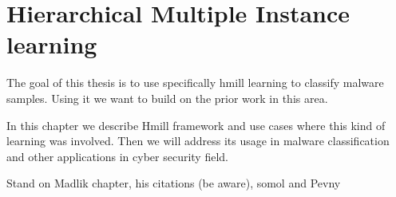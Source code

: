 \chapter{Hierarchical Multiple Instance learning}
The goal of this thesis is to use specifically hmill learning to classify malware samples. Using it we want to  build on the prior work in this area. 

In this chapter we describe Hmill framework and use cases where this kind of learning was involved. Then we will address its usage in malware classification and other applications in cyber security field.


Stand on Madlik chapter, his citations (be aware), somol and Pevny